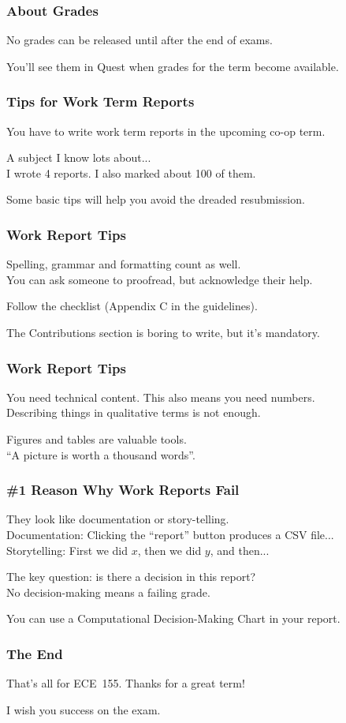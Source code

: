 \begin{frame}
\frametitle{About Grades}

No grades can be released until after the end of exams.

You'll see them in Quest when grades for the term become available.


\end{frame}

\begin{frame}
\frametitle{Tips for Work Term Reports}

You have to write work term reports in the upcoming co-op term.

A subject I know lots about...\\
\quad I wrote 4 reports.
\quad I also marked about 100 of them.

Some basic tips will help you avoid the dreaded resubmission.

\end{frame}


\begin{frame}
\frametitle{Work Report Tips}

Spelling, grammar and formatting count as well.\\
	\quad You can ask someone to proofread, but acknowledge their help.
	
Follow the checklist (Appendix C in the guidelines).

The Contributions section is boring to write, but it's mandatory.

\end{frame}

\begin{frame}
\frametitle{Work Report Tips}

You need technical content. This also means you need numbers.\\
	\quad Describing things in qualitative terms is not enough.

Figures and tables are valuable tools.\\
	\quad ``A picture is worth a thousand words''.

\end{frame}


\begin{frame}
\frametitle{\#1 Reason Why Work Reports Fail}

They look like documentation or story-telling.\\
	\quad Documentation: Clicking the ``report'' button produces a CSV file...\\
	\quad Storytelling: First we did $x$, then we did $y$, and then...

The key question: is there a decision in this report?\\
	\quad No decision-making means a failing grade.
	
You can use a Computational Decision-Making Chart in your report.

\end{frame}


\begin{frame}
\frametitle{The End}

That's all for ECE~155. Thanks for a great term!

I wish you success on the exam.

\end{frame}






